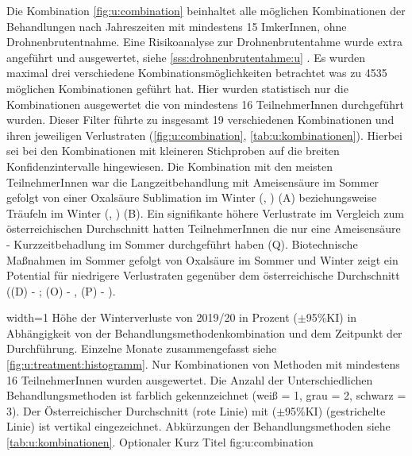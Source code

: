 Die Kombination \cref{fig:u:combination} beinhaltet alle möglichen Kombinationen der Behandlungen nach Jahreszeiten mit mindestens 15 ImkerInnen, ohne Drohnenbrutentnahme. Eine Risikoanalyse zur Drohnenbrutentahme wurde extra angeführt und ausgewertet, siehe \ref{sss:drohnenbrutentahme:u} . Es wurden maximal drei verschiedene Kombinationsmöglichkeiten betrachtet was zu 4535 möglichen Kombinationen geführt hat. Hier wurden statistisch nur die Kombinationen ausgewertet die von mindestens 16 TeilnehmerInnen durchgeführt wurden. Dieser Filter führte zu insgesamt 19 verschiedenen Kombinationen und ihren jeweiligen Verlustraten (\cref{fig:u:combination}, \cref{tab:u:kombinationen}). Hierbei sei bei den Kombinationen mit kleineren Stichproben auf die breiten Konfidenzintervalle hingewiesen.
\newline
Die Kombination mit den meisten TeilnehmerInnen war die Langzeitbehandlung mit Ameisensäure im Sommer gefolgt von einer Oxalsäure Sublimation im Winter (, ) (A) beziehungsweise Träufeln im Winter (, ) (B). Ein signifikante höhere Verlustrate im Vergleich zum österreichischen Durchschnitt hatten TeilnehmerInnen die nur eine Ameisensäure - Kurzzeitbehadlung im Sommer durchgeführt haben  (Q). 
\newline
Biotechnische Maßnahmen im Sommer gefolgt von Oxalsäure im Sommer und Winter zeigt ein Potential für niedrigere Verlustraten gegenüber dem österreichische Durchschnitt ((D) - ; (O) - , (P) - ).

{width=1\textwidth} %
{Höhe der Winterverluste von 2019/20 in Prozent ($\pm$95\%KI) in Abhängigkeit von der Behandlungsmethodenkombination und dem Zeitpunkt der Durchführung. Einzelne Monate zusammengefasst siehe \cref{fig:u:treatment:histogramm}. Nur Kombinationen von Methoden mit mindestens 16 TeilnehmerInnen wurden ausgewertet. Die Anzahl der Unterschiedlichen Behandlungsmethoden ist farblich gekennzeichnet (weiß = 1, grau = 2, schwarz = 3). Der Österreichischer Durchschnitt (rote Linie) mit ($\pm$95\%KI) (gestrichelte Linie) ist vertikal eingezeichnet. Abkürzungen der Behandlungsmethoden siehe \cref{tab:u:kombinationen}.} %
{Optionaler Kurz Titel} %
{fig:u:combination} %

